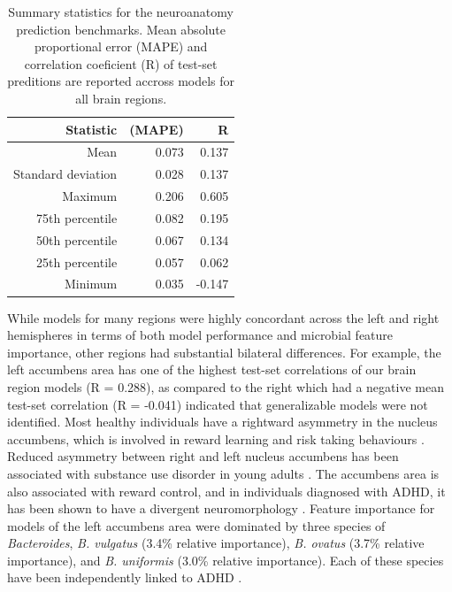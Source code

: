 \documentclass{article}
\begin{document}
\begin{table}[!h]
    \begin{center}
    \begin{tabular}{|r|r|r|}
      \hline\hline
      \textbf{Statistic} & \textbf{(MAPE)} & \textbf{R} \\\hline
      Mean & 0.073 & 0.137 \\
      Standard deviation & 0.028 & 0.137 \\
      Maximum & 0.206 & 0.605 \\
      75th percentile & 0.082 & 0.195 \\
      50th percentile & 0.067 & 0.134 \\
      25th percentile & 0.057 & 0.062 \\
      Minimum & 0.035 & -0.147 \\\hline\hline
    \end{tabular}
    \caption{\label{tab:neuro}Summary statistics for the neuroanatomy prediction benchmarks.
    Mean absolute proportional error (MAPE) and correlation coeficient (R)
    of test-set preditions are reported accross models for all brain regions.}
    \end{center}
\end{table}

While models for many regions were highly concordant across the
left and right hemispheres in terms of both model performance and
microbial feature importance, other regions had substantial
bilateral differences. For example, the left accumbens area
has one of the highest test-set correlations of our
brain region models (R = 0.288), as compared to the right which
had a negative mean test-set correlation (R = -0.041)
indicated that generalizable models were not identified.
Most healthy individuals have a
rightward asymmetry in the nucleus accumbens,
which is involved in reward learning and risk taking behaviours
\cite{ernstAmygdalaNucleusAccumbens2005,yauNucleusAccumbensResponse2012}.
Reduced asymmetry between right and left nucleus accumbens
has been associated with substance use disorder in young adults
\cite{caoMappingCorticalSubcortical2021}. The accumbens area is also
associated with reward control, and in individuals diagnosed with ADHD,
it has been shown to have a divergent neuromorphology
\cite{hoogmanSubcorticalBrainVolume2017}.
Feature importance for models of the left accumbens area were dominated
by three species of \emph{Bacteroides}, \emph{B. vulgatus} (3.4\%
relative importance), \emph{B. ovatus} (3.7\% relative importance), and
\emph{B. uniformis} (3.0\% relative importance). Each of these species
have been independently linked to ADHD
\cite{wangGutMicrobiotaDietary2020}.
\end{document}
